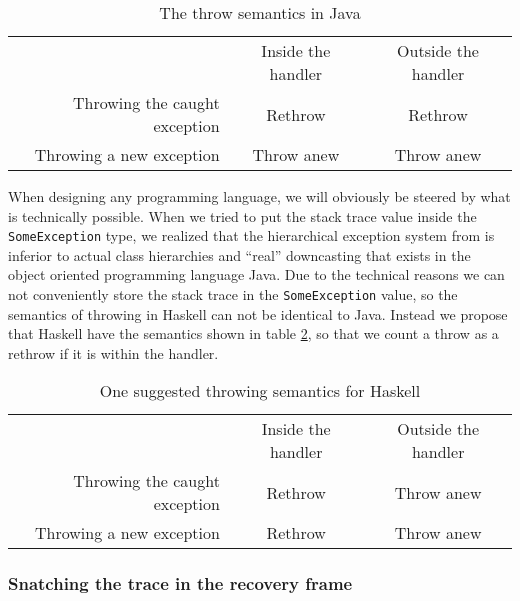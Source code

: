 \begin{table}[t]
  \centering
  \begin{tabular}{ r|c|c| }
    \multicolumn{1}{r}{}
    &  \multicolumn{1}{c}{Inside the handler}
    & \multicolumn{1}{c}{Outside the handler} \\
    \cline{2-3}
    Throwing the caught exception & Rethrow    & Rethrow \\
    \cline{2-3}
    Throwing a new exception      & Throw anew & Throw anew \\
    \cline{2-3}
  \end{tabular}
  \caption{The throw semantics in Java}
  \label{tab:java_throw_semantics}
\end{table}

When designing any programming language, we will obviously be steered by
what is technically possible. When we tried to put the stack trace value
inside the \texttt{SomeException} type, we realized that the
hierarchical exception system from \cite{marlow2006extensible} is
inferior to actual class hierarchies and ``real'' downcasting that exists in the
object oriented programming language Java. Due to the technical reasons
we can not conveniently store the stack trace in the
\texttt{SomeException} value, so the semantics of throwing in Haskell
can not be identical to Java. Instead we propose that Haskell have the
semantics shown in table \ref{tab:haskell_throw_semantics}, so that we count a throw as a rethrow if
it is within the handler.

\begin{table}[t]
  \centering
  \begin{tabular}{ r|c|c| }
    \multicolumn{1}{r}{}
    &  \multicolumn{1}{c}{Inside the handler}
    & \multicolumn{1}{c}{Outside the handler} \\
    \cline{2-3}
    Throwing the caught exception & Rethrow & Throw anew \\
    \cline{2-3}
    Throwing a new exception      & Rethrow & Throw anew \\
    \cline{2-3}
  \end{tabular}
  \caption{One suggested throwing semantics for Haskell}
  \label{tab:haskell_throw_semantics}
\end{table}


\subsubsection{Snatching the trace in the recovery frame}

